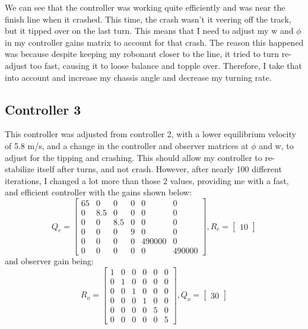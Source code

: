 \documentclass{article}
\begin{document}
We can see that the controller was working quite efficiently and was near the finish line when it crashed. This time, the crash wasn't it veering off the track, but it tipped over on the last turn. This means that I need to adjust my w and $\phi$ in my controller gains matrix to account for that crash. The reason this happened was because despite keeping my robonaut closer to the line, it tried to turn re-adjust too fast, causing it to loose balance and topple over. Therefore, I take that into account and increase my chassis angle and decrease my turning rate.
\subsection{Controller 3}
This controller was adjusted from controller 2, with a lower equilibrium velocity of 5.8 m/s, and a change in the controller and observer matrices at $\phi$ and w, to adjust for the tipping and crashing. This should allow my controller to re-stabilize itself after turns, and not crash. However, after nearly 100 different iterations, I changed a lot more than those 2 values, providing me with a fast, and efficient controller with the gains shown below:
\begin{equation*}
    Q_{c} = \begin{bmatrix}
    65 & 0 & 0 & 0 & 0& 0\\
    0 & 8.5 & 0 & 0 & 0 & 0\\
    0 & 0 & 8.5 & 0 & 0 & 0\\
    0 & 0 & 0 & 9 & 0& 0\\
    0 & 0 & 0 & 0 & 490000& 0\\0&0&0&0&0&490000
    \end{bmatrix} , R_{c} = \begin{bmatrix}
    10
    \end{bmatrix}
\end{equation*}
and observer gain being:
 \begin{equation*}
     R_{o}= \begin{bmatrix}
     1 & 0 & 0 & 0 & 0& 0\\
    0 & 1 & 0 & 0 & 0 & 0\\
    0 & 0 & 1 & 0 & 0 & 0\\
    0 & 0 & 0 & 1 & 0& 0\\
    0 & 0 & 0 & 0 & 5& 0\\0&0&0&0&0&5
    \end{bmatrix} , Q_{o} = \begin{bmatrix}
    30
    \end{bmatrix}
 \end{equation*}
\end{document}
